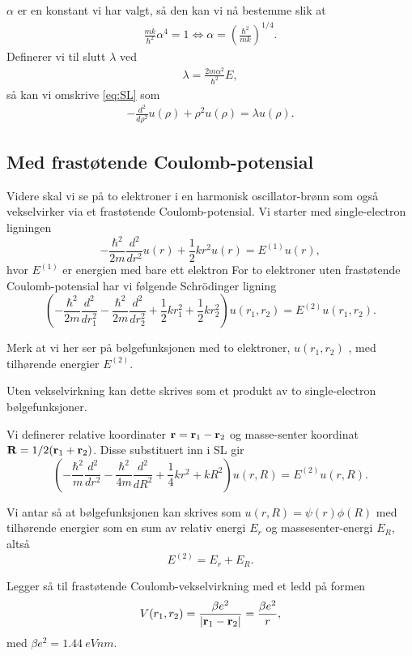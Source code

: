 \documentclass[11pt]{article}
\begin{document}
$\alpha$ er en konstant vi har valgt, så den kan vi nå bestemme slik
at 
\begin{align*}
  \frac{ mk }{ \hbar^2 }\alpha^4 = 1 \Leftrightarrow \alpha = \left(\frac{ \hbar^2 }{ mk }\right)^{1/4}.
\end{align*}
Definerer vi til slutt $\lambda$ ved
\begin{align*}
  \lambda = \frac{ 2m\alpha^2 }{ \hbar^2 }E,
\end{align*}
så kan vi omskrive \eqref{eq:SL} som
\begin{align}
  -\frac{ d^2 }{ d\rho^2 }u(\rho) + \rho^2u(\rho) = \lambda u(\rho).\label{eq:SL-rewrite}
\end{align}

\subsection{Med frastøtende Coulomb-potensial}

Videre skal vi se på to elektroner i en harmonisk oscillator-brønn som også 
vekselvirker via et frastøtende Coulomb-potensial.
Vi starter med single-electron ligningen
\[
  -\frac{\hbar^2}{2 m} \frac{d^2}{dr^2} u(r) 
       + \frac{1}{2}k r^2u(r)  = E^{(1)} u(r),
\]
hvor $E^{(1)}$ er energien med bare ett elektron
For to elektroner uten frastøtende Coulomb-potensial har vi
følgende Schr\"odinger ligning
\[
\left(  -\frac{\hbar^2}{2 m} \frac{d^2}{dr_1^2} -\frac{\hbar^2}{2 m} \frac{d^2}{dr_2^2}+ \frac{1}{2}k r_1^2+ \frac{1}{2}k r_2^2\right)u(r_1,r_2)  = E^{(2)} u(r_1,r_2) .
\]

Merk at vi her ser på bølgefunksjonen med to elektroner, $u(r_1,r_2)$
, med tilhørende energier $E^{(2)}$.

Uten vekselvirkning kan dette skrives som et produkt av to single-electron
bølgefunksjoner.

Vi definerer relative koordinater ${\bf r} = {\bf r}_1-{\bf r}_2$
og masse-senter koordinat ${\bf R} = 1/2({\bf r}_1+{\bf r}_2)$.
Disse substituert inn i SL gir
\[
\left(  -\frac{\hbar^2}{m} \frac{d^2}{dr^2} -\frac{\hbar^2}{4 m} \frac{d^2}{dR^2}+ \frac{1}{4} k r^2+  kR^2\right)u(r,R)  = E^{(2)} u(r,R).
\]


Vi antar så at bølgefunksjonen kan skrives som $u(r,R) = \psi(r)\phi(R)$ med 
tilhørende energier som en sum av relativ energi $E_r$ og massesenter-energi $E_R$, altså
\[
E^{(2)}=E_r+E_R.
\]

Legger så til frastøtende Coulomb-vekselvirkning med et ledd på formen
\[
V(r_1,r_2) = \frac{\beta e^2}{|{\bf r}_1-{\bf r}_2|}=\frac{\beta e^2}{r},
\]
med $\beta e^2=\SI{1.44}{eVnm}$.
\end{document}
